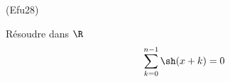 \begin{tiny}(Efu28)\end{tiny} Résoudre dans $\R$
\begin{displaymath}
 \sum_{k=0}^{n-1}\sh(x+k) = 0
\end{displaymath}
